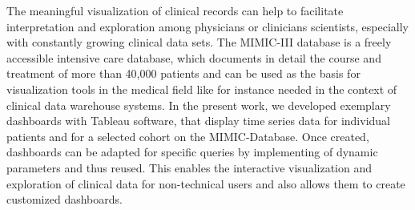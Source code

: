 The meaningful visualization of clinical records can help to facilitate interpretation and exploration among physicians or clinicians scientists, especially with constantly growing clinical data sets. The MIMIC-III database is a freely accessible intensive care database, which documents in detail the course and treatment of more than 40,000 patients and can be used as the basis for visualization tools in the medical field like for instance needed in the context of clinical data warehouse systems. In the present work, we developed exemplary dashboards with Tableau software, that display time series data for individual patients and for a selected cohort on the MIMIC-Database. Once created, dashboards can be adapted for specific queries by implementing of dynamic parameters and thus reused. This enables the interactive visualization and exploration of clinical data for non-technical users and also allows them to create customized dashboards.